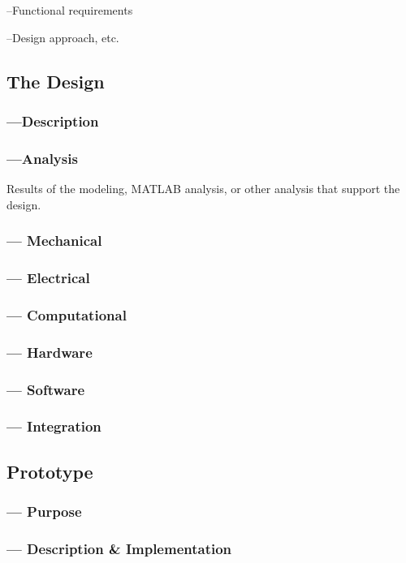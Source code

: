 \documentclass[twocolumn]{article}
\begin{document}
\noindent --Functional requirements

\noindent --Design approach, etc.

\subsection*{The Design}

\subsubsection*{ ---Description}

\subsubsection*{ ---Analysis}
Results of the modeling, MATLAB analysis, or other analysis that support the design.
\subsubsection*{ --- Mechanical}
\subsubsection*{ --- Electrical}
\subsubsection*{ --- Computational}
\subsubsection*{ --- Hardware}
\subsubsection*{ --- Software}
\subsubsection*{ --- Integration}   

\subsection*{Prototype}
\subsubsection*{ --- Purpose}
\subsubsection*{ --- Description \& Implementation}
\end{document}
